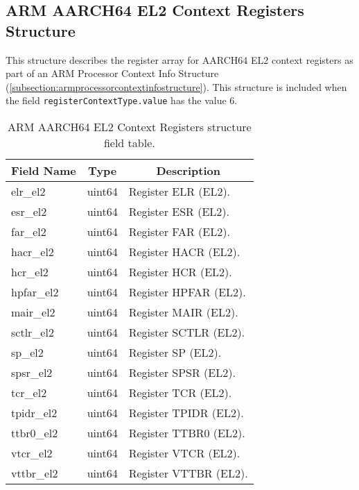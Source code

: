 \documentclass{report}
\newcommand*{\thead}[1]{\multicolumn{1}{|c|}{\bfseries #1}}
\newcommand*{\jsontable}[1]{
    \begin{table}[!ht]
    \label{#1}
    \centering
    \begin{adjustbox}{center}
    \begin{tabular}{|l|c|p{8cm}|}
    \hline
    \thead{Field Name} & \thead{Type} & \thead{Description} \\
    \hline
}
\newcommand*{\jsontableend}[1]{
    \hline
    \end{tabular}
    \end{adjustbox}
    \caption{#1}
    \label{table:#1}
    \end{table}
    \FloatBarrier
}
\begin{document}
\subsection{ARM AARCH64 EL2 Context Registers Structure}
\label{subsection:armaarch64el2contextregistersstructure}
This structure describes the register array for AARCH64 EL2 context registers as part of an ARM Processor Context Info Structure (\ref{subsection:armprocessorcontextinfostructure}). This structure is included when the field \texttt{registerContextType.value} has the value 6.
\jsontable{table:armaarch64el2contextregistersstructure}
elr\_el2 & uint64 & Register ELR (EL2).\\
\hline
esr\_el2 & uint64 & Register ESR (EL2).\\
\hline
far\_el2 & uint64 & Register FAR (EL2).\\
\hline
hacr\_el2 & uint64 & Register HACR (EL2).\\
\hline
hcr\_el2 & uint64 & Register HCR (EL2).\\
\hline
hpfar\_el2 & uint64 & Register HPFAR (EL2).\\
\hline
mair\_el2 & uint64 & Register MAIR (EL2).\\
\hline
sctlr\_el2 & uint64 & Register SCTLR (EL2).\\
\hline
sp\_el2 & uint64 & Register SP (EL2).\\
\hline
spsr\_el2 & uint64 & Register SPSR (EL2).\\
\hline
tcr\_el2 & uint64 & Register TCR (EL2).\\
\hline
tpidr\_el2 & uint64 & Register TPIDR (EL2).\\
\hline
ttbr0\_el2 & uint64 & Register TTBR0 (EL2).\\
\hline
vtcr\_el2 & uint64 & Register VTCR (EL2).\\
\hline
vttbr\_el2 & uint64 & Register VTTBR (EL2).\\
\jsontableend{ARM AARCH64 EL2 Context Registers structure field table.}

\end{document}
